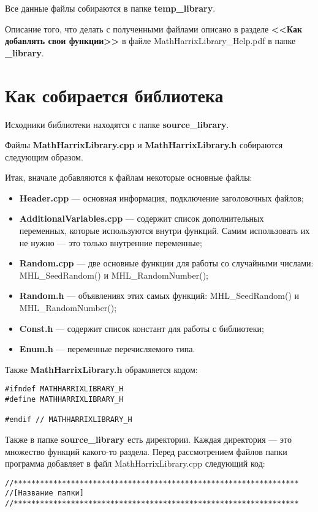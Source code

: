 \documentclass[a4paper,12pt]{article}
\begin{document}
Все данные файлы собираются в папке \textbf{temp\_library}.

Описание того, что делать с полученными файлами описано в разделе \textbf{<<Как добавлять свои функции>>} в файле MathHarrixLibrary\_Help.pdf в папке \textbf{\_library}.

\section{Как собирается библиотека}
Исходники библиотеки находятся с папке \textbf{source\_library}.

Файлы \textbf{MathHarrixLibrary.cpp} и \textbf{MathHarrixLibrary.h} собираются следующим образом.

Итак, вначале добавляются к файлам некоторые основные файлы:

\begin{itemize}
\item \textbf{Header.cpp} --- основная информация, подключение заголовочных файлов;
\item \textbf{AdditionalVariables.cpp} --- содержит список дополнительных переменных, которые используются внутри функций. Самим использовать их не нужно --- это только внутренние переменные;
\item \textbf{Random.cpp} --- две основные функции для работы со случайными числами: MHL\_SeedRandom() и MHL\_RandomNumber();
\item \textbf{Random.h} --- объявлениях этих самых функций: MHL\_SeedRandom() и MHL\_RandomNumber();
\item \textbf{Const.h} --- содержит список констант для работы с библиотеки;
\item \textbf{Enum.h} --- переменные перечисляемого типа.
\end{itemize}

Также \textbf{MathHarrixLibrary.h} обрамляется кодом:
\begin{lstlisting}[label=make_sectioncpp,caption=Обрамление MathHarrixLibrary.h файла]
#ifndef MATHHARRIXLIBRARY_H
#define MATHHARRIXLIBRARY_H

#endif // MATHHARRIXLIBRARY_H
\end{lstlisting}

Также в папке \textbf{source\_library} есть директории. Каждая директория --- это множество функций какого-то раздела. Перед рассмотрением файлов папки программа добавляет в файл MathHarrixLibrary.cpp следующий код:

\begin{lstlisting}[label=make_sectioncpp,caption=Название раздела]
//*****************************************************************
//[Название папки]
//*****************************************************************
\end{lstlisting}
\end{document}
